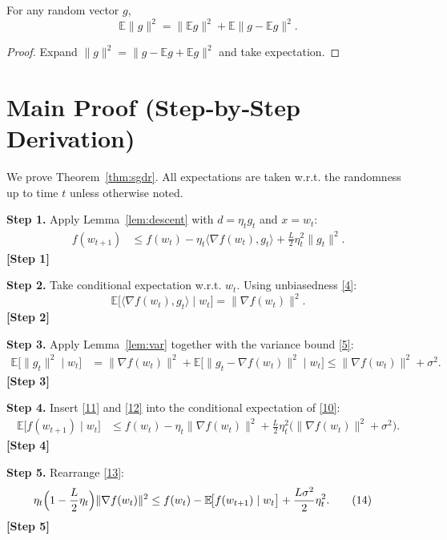 \documentclass{article}
\begin{document}
\begin{lemma}\label{lem:var}
For any random vector $g$,
\[
\mathbb{E}\|g\|^{2}= \|\mathbb{E}g\|^{2}
                     +\mathbb{E}\|g-\mathbb{E}g\|^{2}.
\tag{9}
\]
\end{lemma}
\begin{proof}
Expand $\|g\|^{2}=\|g-\mathbb{E}g+\mathbb{E}g\|^{2}$ and take expectation.
\end{proof}

\section*{Main Proof (Step‑by‑Step Derivation)}
We prove Theorem~\ref{thm:sgdr}.  All expectations are taken w.r.t. the
randomness up to time $t$ unless otherwise noted.

\noindent\textbf{Step 1.} Apply Lemma~\ref{lem:descent} with
$d=\eta_t g_t$ and $x=w_t$:
\begin{align}
f(w_{t+1})
&\le f(w_t)-\eta_t\langle\nabla f(w_t),g_t\rangle
     +\frac{L}{2}\eta_t^{2}\|g_t\|^{2}.
\tag{10}
\end{align}
\textbf{[Step 1]}

\noindent\textbf{Step 2.} Take conditional expectation w.r.t. $w_t$.
Using unbiasedness \eqref{4}:
\[
\mathbb{E}\bigl[\langle\nabla f(w_t),g_t\rangle\mid w_t\bigr]
   =\|\nabla f(w_t)\|^{2}.
\tag{11}
\]
\textbf{[Step 2]}

\noindent\textbf{Step 3.} Apply Lemma~\ref{lem:var} together with the
variance bound \eqref{5}:
\begin{align}
\mathbb{E}\bigl[\|g_t\|^{2}\mid w_t\bigr]
&= \|\nabla f(w_t)\|^{2}
   +\mathbb{E}\bigl[\|g_t-\nabla f(w_t)\|^{2}\mid w_t\bigr]
 \le \|\nabla f(w_t)\|^{2}+\sigma^{2}.
\tag{12}
\end{align}
\textbf{[Step 3]}

\noindent\textbf{Step 4.} Insert \eqref{11} and \eqref{12} into the
conditional expectation of \eqref{10}:
\begin{align}
\mathbb{E}\!\bigl[f(w_{t+1})\mid w_t\bigr]
&\le f(w_t)-\eta_t\|\nabla f(w_t)\|^{2}
   +\frac{L}{2}\eta_t^{2}\bigl(\|\nabla f(w_t)\|^{2}+\sigma^{2}\bigr).
\tag{13}
\end{align}
\textbf{[Step 4]}

\noindent\textbf{Step 5.} Rearrange \eqref{13}:
\begin{align}
\eta_t\Bigl(1-\frac{L}{2}\eta_t\Bigr)\|\nabla f(w_t)\|^{2}
&\le f(w_t)-\mathbb{E}\!\bigl[f(w_{t+1})\mid w_t\bigr]
   +\frac{L\sigma^{2}}{2}\eta_t^{2}.
\tag{14}
\end{align}
\textbf{[Step 5]}
\end{document}
